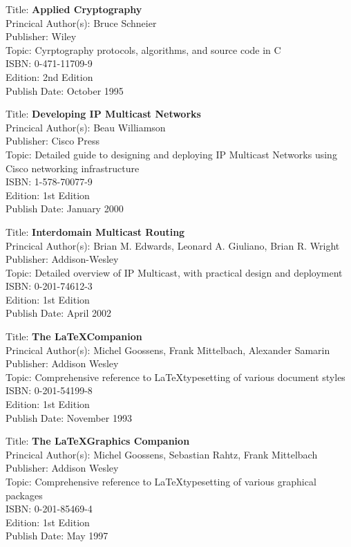 Title: 	\textbf{Applied Cryptography}	\\
Princical Author(s): 	Bruce Schneier  \\
Publisher:	Wiley	\\	
Topic:		Cyrptography protocols, algorithms, and source code in C \\
ISBN:			0-471-11709-9 \\
Edition:		2nd Edition \\
Publish Date:		October 1995


Title: 	\textbf{Developing IP Multicast Networks}	\\
Princical Author(s): 	Beau Williamson  \\
Publisher:	Cisco Press	\\	
Topic:		Detailed guide to designing and deploying IP Multicast Networks using Cisco networking infrastructure \\
ISBN:			1-578-70077-9 \\
Edition:		1st Edition \\
Publish Date:		January 2000


Title: 	\textbf{Interdomain Multicast Routing}	\\
Princical Author(s): 	Brian M. Edwards, Leonard A. Giuliano, Brian R. Wright\\
Publisher:	Addison-Wesley	\\	
Topic:		Detailed overview of IP Multicast, with practical design and deployment \\
ISBN:			0-201-74612-3 \\
Edition:		1st Edition \\
Publish Date:		April 2002


Title: 	\textbf{The \LaTeX  Companion}	\\
Princical Author(s): 	Michel Goossens, Frank Mittelbach, Alexander Samarin  \\
Publisher:	Addison Wesley	\\	
Topic:		Comprehensive reference to \LaTeX typesetting of various document styles \\
ISBN:			0-201-54199-8 \\
Edition:		1st Edition \\
Publish Date:		November 1993


Title: 	\textbf{The \LaTeX Graphics Companion}	\\
Princical Author(s): 	Michel Goossens, Sebastian Rahtz, Frank Mittelbach  \\
Publisher:	Addison Wesley	\\	
Topic:		Comprehensive reference to \LaTeX typesetting of various graphical packages \\
ISBN:			0-201-85469-4 \\
Edition:		1st Edition \\
Publish Date:		May 1997


